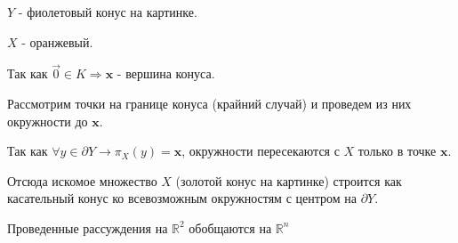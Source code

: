 \documentclass[a4paper,12pt]{article}
\begin{document}
\vspace{\baselineskip}


$Y$ - фиолетовый конус на картинке.

$X$ - оранжевый.

Так как $\vec{0} \in K \Rightarrow \mathbf{x}$ - вершина конуса.

Рассмотрим точки на границе конуса (крайний случай) и проведем из них окружности до $\mathbf{x}$.

Так как $\forall y \in \partial Y \rightarrow \pi_X(y) = \mathbf{x}$, окружности пересекаются с $X$ только в точке $\mathbf{x}$.

Отсюда искомое множество $X$ (золотой конус на картинке) строится как касательный конус ко всевозможным окружностям с центром на $\partial Y$.

Проведенные рассуждения на $\mathbb{R}^2$ обобщаются на $\mathbb{R}^n$
\end{document}
